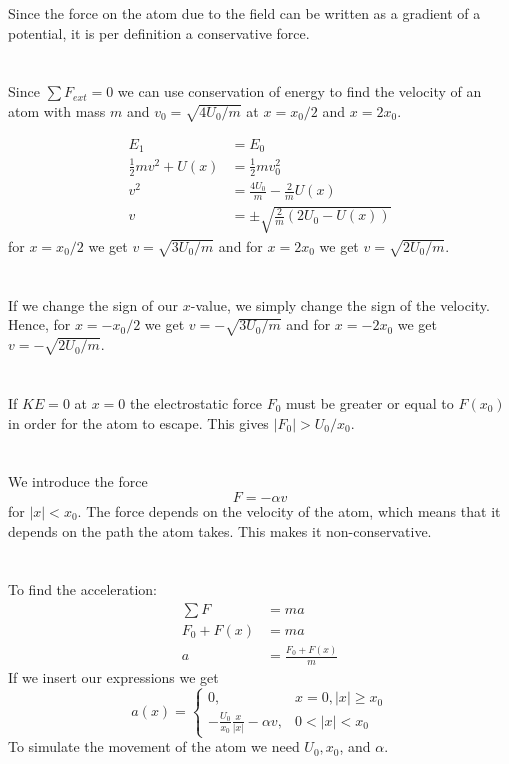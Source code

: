 \documentclass[a4paper,10pt,english]{article}
\begin{document}
Since the force on the atom due to the field can be written as a gradient of a potential, it is per definition a conservative force.

\section{}
Since $\sum F_{ext} = 0$ we can use conservation of energy to find the velocity of an atom with mass $m$ and $v_0 = \sqrt{4U_0/m}$ at $x=x_0/2$ and $x=2x_0$.

\begin{align*}
    E_1 &= E_0 \\
    \frac{1}{2}m v^2 + U(x) &= \frac{1}{2}m v_0^2 \\
    v^2 &= \frac{4U_0}{m} - \frac{2}{m}U(x) \\
    v &= 
    \pm \sqrt{
        \frac{2}{m}(2U_0 - U(x))
    }
\end{align*}
for $x=x_0/2$ we get $v=\sqrt{3U_0/m}$ and for $x=2x_0$ we get $v=\sqrt{2U_0/m}$.

\section{}
If we change the sign of our $x$-value, we simply change the sign of the velocity. Hence, for $x=-x_0/2$ we get $v=-\sqrt{3U_0/m}$ and for $x=-2x_0$ we get $v=-\sqrt{2U_0/m}$.

\section{}
If $KE=0$ at $x=0$ the electrostatic force $F_0$ must be greater or equal to $F(x_0)$ in order for the atom to escape. This gives $|F_0| > U_0/x_0$.

\newpage
\section{}
We introduce the force
\begin{equation}
    F = - \alpha v
\end{equation}
for $|x|< x_0$. The force depends on the velocity of the atom, which means that it depends on the path the atom takes. This makes it non-conservative.

\section{}
To find the acceleration:
\begin{align*}
    \sum F &= ma \\
    F_0 + F(x) &= ma \\
    a &= \frac{F_0 + F(x)}{m}
\end{align*}
If we insert our expressions we get
\begin{equation}
a(x) = 
    \left\{\begin{matrix}
    0, & x=0, |x| \geq x_0 \\ 
    - \frac{U_0}{x_0}\frac{x}{|x|} - \alpha v, & 0 < |x| < x_0
    \end{matrix}\right.
\end{equation}
To simulate the movement of the atom we need $U_0, x_0$, and $\alpha$.
\end{document}
